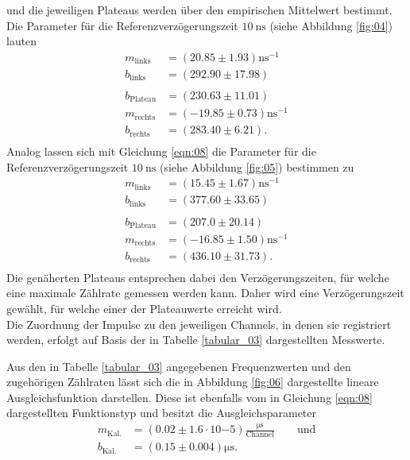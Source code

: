 \noindent  und die jeweiligen Plateaus werden über den empirischen Mittelwert bestimmt.
\noindent Die Parameter für die Referenzverzögerungszeit $\SI{10}{\nano\second}$
(siehe Abbildung \ref{fig:04}) lauten
\begin{align*}
  m_\text{links}   &= {(20.85 \pm 1.93)} \si{\nano\second^{-1}} \\
  b_\text{links}   &= {(292.90 \pm 17.98)} \\\\
  b_\text{Plateau} &= {(230.63 \pm 11.01)} \\
  m_\text{rechts}  &= {(-19.85 \pm 0.73)} \si{\nano\second^{-1}} \\
  b_\text{rechts}  &= {(283.40 \pm 6.21)}. \\
\end{align*}
\noindent Analog lassen sich mit Gleichung \ref{eqn:08} die Parameter
für die Referenzverzögerungszeit $\SI{10}{\nano\second}$
(siehe Abbildung \ref{fig:05}) bestimmen zu
\begin{align*}
  m_\text{links}   &= {(15.45 \pm 1.67)} \si{\nano\second^{-1}} \\
  b_\text{links}   &= {(377.60 \pm 33.65)} \\\\
  b_\text{Plateau} &= {(207.0 \pm 20.14)} \\
  m_\text{rechts}  &= {(-16.85 \pm 1.50)} \si{\nano\second^{-1}} \\
  b_\text{rechts}  &= {(436.10 \pm 31.73)}. \\
\end{align*}
\noindent Die genäherten Plateaus entsprechen dabei den Verzögerungszeiten, für
welche eine maximale Zählrate gemessen werden kann. Daher wird eine
Verzögerungszeit gewählt, für welche einer der Plateauwerte erreicht wird. \\
\newline
\noindent Die Zuordnung der Impulse zu den jeweiligen Channels, in denen sie
registriert werden, erfolgt auf Basis der in Tabelle \ref{tabular_03} dargestellten
Messwerte. \\
\FloatBarrier

\FloatBarrier
\noindent Aus den in Tabelle \ref{tabular_03} angegebenen Frequenzwerten und den
zugehörigen Zählraten lässt sich die in Abbildung \ref{fig:06} dargestellte
lineare Ausgleichsfunktion darstellen. Diese ist ebenfalls vom in Gleichung
\ref{eqn:08} dargestellten Funktionstyp und besitzt die Ausgleichsparameter
\begin{align*}
  m_\text{Kal.} &= (0.02 \pm 1.6 \cdot 10{-5}) \frac{\si{\micro\second}}{\text{Channel}}  \qquad \text{und}\\
  b_\text{Kal.} &= (0.15 \pm 0.004) \si{\micro\second}.
\end{align*}
